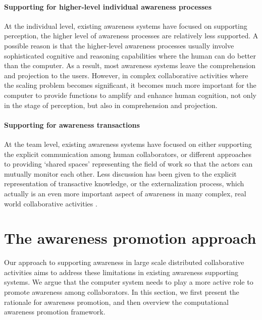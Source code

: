 \paragraph*{Supporting for higher-level individual awareness processes} %
\label{par:supporting_for_higher_level_individual_awareness_processes}
At the individual level, existing awareness systems have focused on supporting perception, the higher level of awareness processes are relatively less supported. A possible reason is that the higher-level awareness processes usually involve sophisticated cognitive and reasoning capabilities where the human can do better than the computer. As a result, most awareness systems leave the comprehension and projection to the users. However, in complex collaborative activities where the scaling problem becomes significant, it becomes much more important for the computer to provide functions to amplify and enhance human cognition, not only in the stage of perception, but also in comprehension and projection.

\paragraph*{Supporting for awareness transactions} %
\label{par:supporting_for_awareness_transactions}
At the team level, existing awareness systems have focused on either supporting the explicit communication among human collaborators, or different approaches to providing `shared spaces' representing the field of work so that the actors can mutually monitor each other. Less discussion has been given to the explicit representation of transactive knowledge, or the externalization process, which actually is an even more important aspect of awareness in many complex, real world collaborative activities \cite{heath2002a}.

\section{The awareness promotion approach} %
\label{sec:awareness_promotion_approach}
Our approach to supporting awareness in large scale distributed collaborative activities aims to address these limitations in existing awareness supporting systems. We argue that the computer system needs to play a more active role to promote awareness among collaborators. In this section, we first present the rationale for awareness promotion, and then overview the computational awareness promotion framework.

